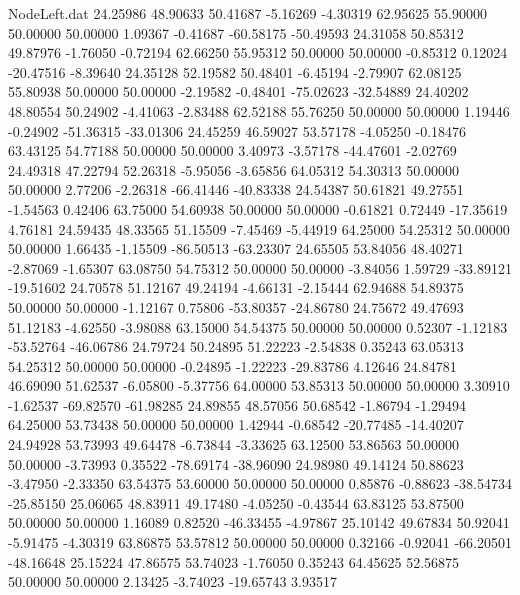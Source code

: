 \begin{filecontents}{NodeLeft.dat}
  24.25986   48.90633   50.41687    -5.16269   -4.30319   62.95625   55.90000   50.00000   50.00000    1.09367   -0.41687  -60.58175  -50.49593
  24.31058   50.85312   49.87976    -1.76050   -0.72194   62.66250   55.95312   50.00000   50.00000   -0.85312    0.12024  -20.47516   -8.39640
  24.35128   52.19582   50.48401    -6.45194   -2.79907   62.08125   55.80938   50.00000   50.00000   -2.19582   -0.48401  -75.02623  -32.54889
  24.40202   48.80554   50.24902    -4.41063   -2.83488   62.52188   55.76250   50.00000   50.00000    1.19446   -0.24902  -51.36315  -33.01306
  24.45259   46.59027   53.57178    -4.05250   -0.18476   63.43125   54.77188   50.00000   50.00000    3.40973   -3.57178  -44.47601   -2.02769
  24.49318   47.22794   52.26318    -5.95056   -3.65856   64.05312   54.30313   50.00000   50.00000    2.77206   -2.26318  -66.41446  -40.83338
  24.54387   50.61821   49.27551    -1.54563    0.42406   63.75000   54.60938   50.00000   50.00000   -0.61821    0.72449  -17.35619    4.76181
  24.59435   48.33565   51.15509    -7.45469   -5.44919   64.25000   54.25312   50.00000   50.00000    1.66435   -1.15509  -86.50513  -63.23307
  24.65505   53.84056   48.40271    -2.87069   -1.65307   63.08750   54.75312   50.00000   50.00000   -3.84056    1.59729  -33.89121  -19.51602
  24.70578   51.12167   49.24194    -4.66131   -2.15444   62.94688   54.89375   50.00000   50.00000   -1.12167    0.75806  -53.80357  -24.86780
  24.75672   49.47693   51.12183    -4.62550   -3.98088   63.15000   54.54375   50.00000   50.00000    0.52307   -1.12183  -53.52764  -46.06786
  24.79724   50.24895   51.22223    -2.54838    0.35243   63.05313   54.25312   50.00000   50.00000   -0.24895   -1.22223  -29.83786    4.12646
  24.84781   46.69090   51.62537    -6.05800   -5.37756   64.00000   53.85313   50.00000   50.00000    3.30910   -1.62537  -69.82570  -61.98285
  24.89855   48.57056   50.68542    -1.86794   -1.29494   64.25000   53.73438   50.00000   50.00000    1.42944   -0.68542  -20.77485  -14.40207
  24.94928   53.73993   49.64478    -6.73844   -3.33625   63.12500   53.86563   50.00000   50.00000   -3.73993    0.35522  -78.69174  -38.96090
  24.98980   49.14124   50.88623    -3.47950   -2.33350   63.54375   53.60000   50.00000   50.00000    0.85876   -0.88623  -38.54734  -25.85150
  25.06065   48.83911   49.17480    -4.05250   -0.43544   63.83125   53.87500   50.00000   50.00000    1.16089    0.82520  -46.33455   -4.97867
  25.10142   49.67834   50.92041    -5.91475   -4.30319   63.86875   53.57812   50.00000   50.00000    0.32166   -0.92041  -66.20501  -48.16648
  25.15224   47.86575   53.74023    -1.76050    0.35243   64.45625   52.56875   50.00000   50.00000    2.13425   -3.74023  -19.65743    3.93517

\end{filecontents}
